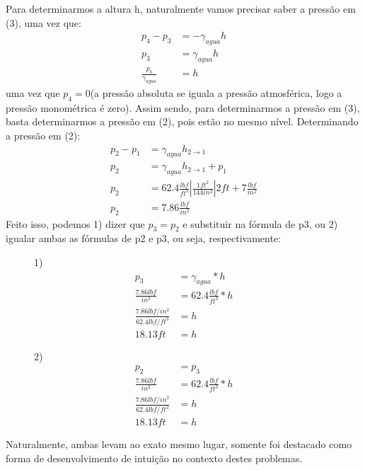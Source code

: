 \documentclass{article}
\begin{document}
Para determinarmos a altura h, naturalmente vamos precisar saber a pressão em (3), uma vez que:
\begin{align*}
     p_4-p_3&=-\gamma_{agua}h\\
     p_3&=\gamma_{agua}h\\
     \frac{p_3}{\gamma_{agua}}&=h
\end{align*}
uma vez que $p_4=0$(a pressão absoluta se iguala a pressão atmosférica, logo a pressão monométrica é zero).
Assim sendo, para determinarmos a pressão em (3), basta determinarmos a pressão em (2), pois estão no mesmo nível.
Determinando a pressão em (2):
\begin{align*}
     p_2-p_1&=\gamma_{agua}h_{2\rightarrow1}\\
     p_2&=\gamma_{agua}h_{2\rightarrow1}+p_1\\
     p_2&=62.4\frac{lbf}{ft^3}\left|\frac{1ft^2}{144in^2}\right|2ft+7\frac{lbf}{in^2}\\
     p_2&=7.86\frac{lbf}{in^2}
\end{align*}
\newpage
Feito isso, podemos 1) dizer que $p_3=p_2$ e substituir na fórmula de p3, ou 2) igualar ambas as fórmulas de p2 e p3, ou seja, respectivamente:

\begin{figure}[!h]
\centering
\begin{minipage}{0.5\textwidth}
     1)
     \begin{align*}
     p_3&=\gamma_{agua}*h\\
     \frac{7.86lbf}{in^2}&=62.4\frac{lbf}{ft^3}*h\\
     \frac{7.86lbf/in^2}{62.4lbf/ft^3}&=h\\
     18.13ft&=h
\end{align*}
\end{minipage}\hfill
\begin{minipage}{0.5\textwidth}
     2)
   \begin{align*}
     p_2&=p_3\\
     \frac{7.86lbf}{in^2}&=62.4\frac{lbf}{ft^3}*h\\
     \frac{7.86lbf/in^2}{62.4lbf/ft^3}&=h\\
     18.13ft&=h
\end{align*}
\end{minipage}
\end{figure}

Naturalmente, ambas levam ao exato mesmo lugar, somente foi destacado como forma de desenvolvimento de intuição no contexto destes problemas.
 
\end{document}
